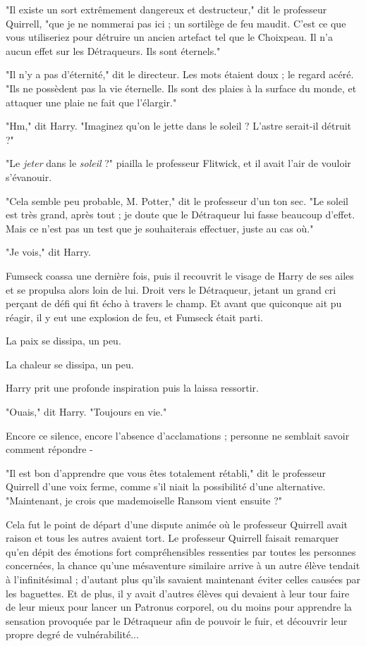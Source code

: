 "Il existe un sort extrêmement dangereux et destructeur," dit le professeur Quirrell, "que je ne nommerai pas ici ; un sortilège de feu maudit. C'est ce que vous utiliseriez pour détruire un ancien artefact tel que le Choixpeau. Il n'a aucun effet sur les Détraqueurs. Ils sont éternels."

"Il n'y a pas d'éternité," dit le directeur. Les mots étaient doux ; le regard acéré. "Ils ne possèdent pas la vie éternelle. Ils sont des plaies à la surface du monde, et attaquer une plaie ne fait que l'élargir."

"Hm," dit Harry. "Imaginez qu'on le jette dans le soleil ? L'astre serait-il détruit ?"

"Le \emph{jeter}  dans le \emph{soleil}  ?" piailla le professeur Flitwick, et il avait l'air de vouloir s'évanouir.

"Cela semble peu probable, M. Potter," dit le professeur d'un ton sec. "Le soleil est très grand, après tout ; je doute que le Détraqueur lui fasse beaucoup d'effet. Mais ce n'est pas un test que je souhaiterais effectuer, juste au cas où."

"Je vois," dit Harry.

Fumseck coassa une dernière fois, puis il recouvrit le visage de Harry de ses ailes et se propulsa alors loin de lui. Droit vers le Détraqueur, jetant un grand cri perçant de défi qui fit écho à travers le champ. Et avant que quiconque ait pu réagir, il y eut une explosion de feu, et Fumseck était parti.

La paix se dissipa, un peu.

La chaleur se dissipa, un peu.

Harry prit une profonde inspiration puis la laissa ressortir.

"Ouais," dit Harry. "Toujours en vie."

Encore ce silence, encore l'absence d'acclamations ; personne ne semblait savoir comment répondre -

"Il est bon d'apprendre que vous êtes totalement rétabli," dit le professeur Quirrell d'une voix ferme, comme s'il niait la possibilité d'une alternative. "Maintenant, je crois que mademoiselle Ransom vient ensuite ?"

Cela fut le point de départ d'une dispute animée où le professeur Quirrell avait raison et tous les autres avaient tort. Le professeur Quirrell faisait remarquer qu'en dépit des émotions fort compréhensibles ressenties par toutes les personnes concernées, la chance qu'une mésaventure similaire arrive à un autre élève tendait à l'infinitésimal ; d'autant plus qu'ils savaient maintenant éviter celles causées par les baguettes. Et de plus, il y avait d'autres élèves qui devaient à leur tour faire de leur mieux pour lancer un Patronus corporel, ou du moins pour apprendre la sensation provoquée par le Détraqueur afin de pouvoir le fuir, et découvrir leur propre degré de vulnérabilité...

